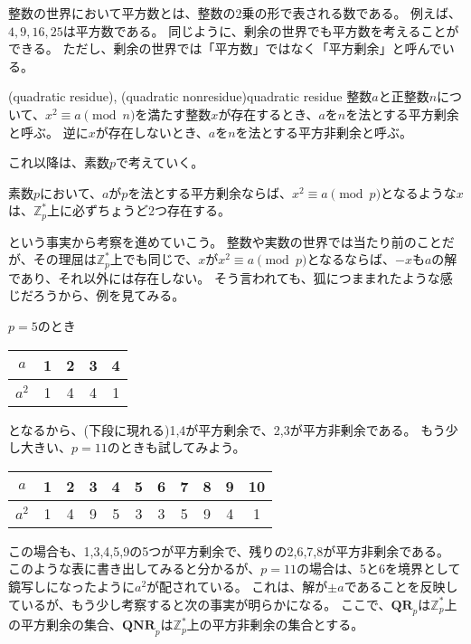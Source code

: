 整数の世界において平方数とは、整数の2乗の形で表される数である。
例えば、$4, 9, 16, 25$は平方数である。
同じように、剰余の世界でも平方数を考えることができる。
ただし、剰余の世界では「平方数」ではなく「平方剰余」と呼んでいる。

\begin{Defi}{(quadratic residue), (quadratic nonresidue)}{quadratic residue}
整数$a$と正整数$n$について、$x^2 \equiv a \pmod{n}$を満たす整数$x$が存在するとき、$a$を$n$を法とする平方剰余と呼ぶ。
逆に$x$が存在しないとき、$a$を$n$を法とする平方非剰余と呼ぶ。
\end{Defi}

これ以降は、素数$p$で考えていく。

\begin{Prop}{}{}
素数$p$において、$a$が$p$を法とする平方剰余ならば、$x^2\equiv a\pmod{p}$となるような$x$は、$\mathbb{Z}_p^*$上に必ずちょうど2つ存在する。
\end{Prop}

という事実から考察を進めていこう。
整数や実数の世界では当たり前のことだが、その理屈は$\mathbb{Z}_p^*$上でも同じで、$x$が$x^2\equiv a\pmod{p}$となるならば、$-x$も$a$の解であり、それ以外には存在しない。
そう言われても、狐につままれたような感じだろうから、例を見てみる。

$p=5$のとき
\begin{table}[h]
  \begin{tabular}{|c||c|c|c|c|}\hline
    $a$ & 1 & 2 & 3 & 4 \\\hline
    $a^2$ & 1 & 4 & 4 & 1 \\\hline
  \end{tabular}
\end{table}

となるから、(下段に現れる)1,4が平方剰余で、2,3が平方非剰余である。
もう少し大きい、$p=11$のときも試してみよう。
\begin{table}[h]
  \begin{tabular}{|c||c|c|c|c|c|c|c|c|c|c|}\hline
    $a$ & 1 & 2 & 3 & 4 & 5 & 6 & 7 & 8 & 9 & 10 \\\hline
    $a^2$ & 1 & 4 & 9 & 5 & 3 & 3 & 5 & 9 & 4 & 1 \\\hline
  \end{tabular}
\end{table}

この場合も、1,3,4,5,9の5つが平方剰余で、残りの2,6,7,8が平方非剰余である。
このような表に書き出してみると分かるが、$p=11$の場合は、5と6を境界として鏡写しになったように$a^2$が配されている。
これは、解が$\pm a$であることを反映しているが、もう少し考察すると次の事実が明らかになる。
ここで、$\mathbf{QR}_p$は$\mathbb{Z}_p^*$上の平方剰余の集合、$\mathbf{QNR}_p$は$\mathbb{Z}_p^*$上の平方非剰余の集合とする。

